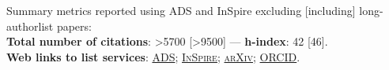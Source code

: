 Summary metrics reported using ADS and InSpire excluding [including] long-authorlist papers:
\\
\textcolor{mark_color}{\textbf{Total number of citations}}: >5700 [>9500]
 --- 
\textcolor{mark_color}{\textbf{h-index}}: 42 [46].
\\
\textcolor{mark_color}{\textbf{Web links to list services}}:
\href{https://davidegerosa.com/myads}{\textsc{ADS}};
\href{https://davidegerosa.com/myinspire}{\textsc{InSpire}};
\href{http://davidegerosa.com/myarxiv}{\textsc{arXiv}};
\href{https://davidegerosa.com/myorcid}{\textsc{ORCID}}.